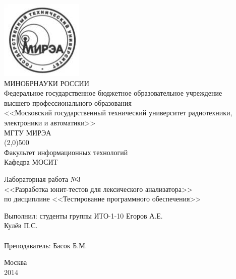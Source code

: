 \documentclass[a4paper,12pt]{article}
\begin{document}
\begin{titlepage}
\begin{center}
  \includegraphics[scale=0.5]{label.jpg}\\
  \vspace{20pt}
  МИНОБРНАУКИ РОССИИ\\
      Федеральное государственное бюджетное образовательное учреждение\\
      высшего профессионального образования\\
    <<Московский государственный технический университет радиотехники,\\
    электроники и автоматики>>\\ 
    {\large МГТУ МИРЭА}\\
    \line(2,0){500}\\
    \vspace{10pt}
    {\large Факультет информационных технологий\\}
    \vspace{10pt}
    {\large Кафедра МОСИТ}
\end{center}

\vspace{60pt}
\begin{center}
  Лабораторная работа №3\\
  \vspace{10pt}
  <<Разработка юнит-тестов для лексического анализатора>>\\
  \vspace{10pt}
  по дисциплине <<Тестирование программного обеспечения>>
\end{center}
\vspace{\fill}
Выполнил: \hfill студенты группы ИТО-1-10 Егоров А.Е.\\
\text{} \hfill Кулёв П.С.\\
\\
Преподаватель: \hfill Басок Б.М.
\begin{center}
\vspace{\fill}
Москва\\2014
\end{center}
\end{titlepage}
\end{document}
